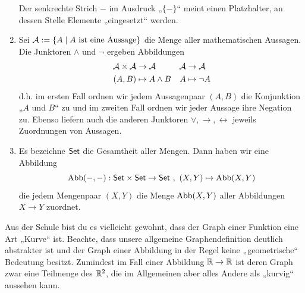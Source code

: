 \begin{bsp}
\begin{enumerate}
        Der senkrechte Strich $-$ im Ausdruck „$\{-\}$“ meint einen Platzhalter, an dessen Stelle Elemente „eingesetzt“ werden.
        \item Sei $\mathcal A:=\{A\mid A\ \text{ist eine Aussage}\}$ die Menge aller mathematischen Aussagen. Die Junktoren $\land$ und $\neg$ ergeben Abbildungen
        \begin{align*}
            \mathcal A\times \mathcal A & \to \mathcal A & \mathcal A & \to \mathcal A \\
            (A,B) & \mapsto A\land B & A& \mapsto \neg A
        \end{align*}
        d.h. im ersten Fall ordnen wir jedem Aussagenpaar $(A,B)$ die Konjunktion „$A$ und $B$“ zu und im zweiten Fall ordnen wir jeder Aussage ihre Negation zu. Ebenso liefern auch die anderen Junktoren $\lor,\to,\leftrightarrow$ jeweils Zuordnungen von Aussagen.
        \item Es bezeichne $\mathsf{Set}$ die Gesamtheit aller Mengen. Dann haben wir eine Abbildung
            \[ \operatorname{Abb}(-,-) : \mathsf{Set} \times \mathsf{Set} \to \mathsf{Set} \ ,\ (X,Y) \mapsto \operatorname{Abb}(X,Y) \]
        die jedem Mengenpaar $(X,Y)$ die Menge $\operatorname{Abb}(X,Y)$ aller Abbildungen $X\to Y$ zuordnet.
    \end{enumerate}
    Aus der Schule bist du es vielleicht gewohnt, dass der Graph einer Funktion eine Art „Kurve“ ist. Beachte, dass unsere allgemeine Graphendefinition deutlich abstrakter ist und der Graph einer Abbildung in der Regel keine „geometrische“ Bedeutung besitzt. Zumindest im Fall einer Abbildung $\mathbb R\to \mathbb R$ ist deren Graph zwar eine Teilmenge des $\mathbb R^2$, die im Allgemeinen aber alles Andere als „kurvig“ aussehen kann.
\end{bsp}


